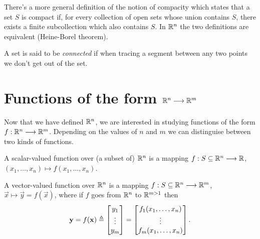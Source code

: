 \begin{note}
    There's a more general definition of the notion of compacity which states that a set $S$ is compact if, for every
    collection of open sets whose union contains $S$, there exists a finite subcollection which also contains $S$.
    In $\Rtn$ the two definitions are equivalent (Heine-Borel theorem).
\end{note}

\begin{defn}
A set is said to be \textit{connected} if when tracing a segment between any two points we don't get out of the set.
\end{defn}


\section{Functions of the form $\Rtn\longrightarrow\R^m$}
Now that we have defined $\Rtn$, we are interested in studying functions of the form $\stdvf$. Depending on the values of 
$n$ and $m$ we can distinguise between two kinds of functions.

\begin{defn}\label{def:scalar-function}
	A scalar-valued function over (a subset of) $\Rtn$ is a mapping $\appl{f}{S\subseteq\Rtn}{\R}$, $\left(x_1, \ldots, x_n\right)
	\longmapsto f\left(x_1, \ldots, x_n\right)$.
\end{defn}

\begin{defn}
	A vector-valued function over $\Rtn$ is a mapping $\appl{f}{S\subseteq\Rtn}{\R^m}$, $\vec{x}\longmapsto\vec{y} = f(\vec{x})$, where
	if $f$ goes from $\Rtn$ to $\R^{m>1}$ then
	\begin{equation}
		\mathbf{y} = f(\mathbf{x})\triangleq\begin{bmatrix}y_1 \\ \vdots \\ y_m \end{bmatrix} = \begin{bmatrix}f_1(x_1, \ldots, x_n) \\
		\vdots \\ f_m(x_1, \ldots, x_n)\end{bmatrix}.
	\end{equation}
\end{defn}

